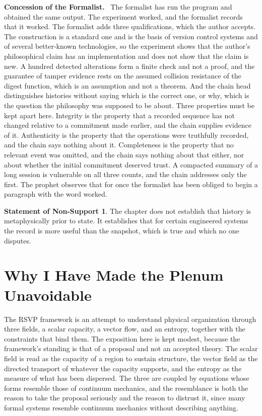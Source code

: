 \documentclass[11pt,openany,twoside]{book}
\theoremstyle{plain}
\theoremstyle{definition}
\newtheorem{nonsupport}{Statement of Non-Support}
\theoremstyle{remark}
\newenvironment{concession}{\par\medskip\noindent\textbf{Concession of the Formalist.}\ }{\par\medskip}
\begin{document}
\begin{concession}
The formalist has run the program and obtained the same output. The experiment worked, and the formalist records that it worked. The formalist adds three qualifications, which the author accepts. The construction is a standard one and is the basis of version control systems and of several better-known technologies, so the experiment shows that the author's philosophical claim has an implementation and does not show that the claim is new. A hundred detected alterations form a finite check and not a proof, and the guarantee of tamper evidence rests on the assumed collision resistance of the digest function, which is an assumption and not a theorem. And the chain head distinguishes histories without saying which is the correct one, or why, which is the question the philosophy was supposed to be about. Three properties must be kept apart here. Integrity is the property that a recorded sequence has not changed relative to a commitment made earlier, and the chain supplies evidence of it. Authenticity is the property that the operations were truthfully recorded, and the chain says nothing about it. Completeness is the property that no relevant event was omitted, and the chain says nothing about that either, nor about whether the initial commitment deserved trust. A compacted summary of a long session is vulnerable on all three counts, and the chain addresses only the first. The prophet observes that for once the formalist has been obliged to begin a paragraph with the word worked.
\end{concession}

\begin{nonsupport}
The chapter does not establish that history is metaphysically prior to state. It establishes that for certain engineered systems the record is more useful than the snapshot, which is true and which no one disputes.
\end{nonsupport}

\chapter{Why I Have Made the Plenum Unavoidable}

The RSVP framework is an attempt to understand physical organization through three fields, a scalar capacity, a vector flow, and an entropy, together with the constraints that bind them. The exposition here is kept modest, because the framework's standing is that of a proposal and not an accepted theory. The scalar field is read as the capacity of a region to sustain structure, the vector field as the directed transport of whatever the capacity supports, and the entropy as the measure of what has been dispersed. The three are coupled by equations whose forms resemble those of continuum mechanics, and the resemblance is both the reason to take the proposal seriously and the reason to distrust it, since many formal systems resemble continuum mechanics without describing anything.
\end{document}
